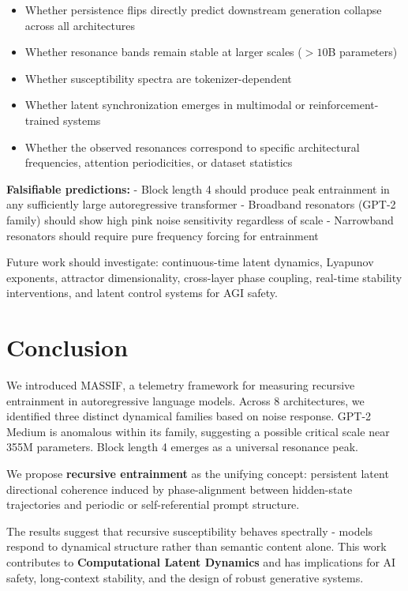 \documentclass{article}
\begin{document}
\begin{itemize}
    \item Whether persistence flips directly predict downstream generation collapse across all architectures
    \item Whether resonance bands remain stable at larger scales ($>10$B parameters)
    \item Whether susceptibility spectra are tokenizer-dependent
    \item Whether latent synchronization emerges in multimodal or reinforcement-trained systems
    \item Whether the observed resonances correspond to specific architectural frequencies, attention periodicities, or dataset statistics
\end{itemize}

\textbf{Falsifiable predictions:}
- Block length 4 should produce peak entrainment in any sufficiently large autoregressive transformer
- Broadband resonators (GPT-2 family) should show high pink noise sensitivity regardless of scale
- Narrowband resonators should require pure frequency forcing for entrainment

Future work should investigate: continuous-time latent dynamics, Lyapunov exponents, attractor dimensionality, cross-layer phase coupling, real-time stability interventions, and latent control systems for AGI safety.

\section{Conclusion}

We introduced MASSIF, a telemetry framework for measuring recursive entrainment in autoregressive language models. Across 8 architectures, we identified three distinct dynamical families based on noise response. GPT-2 Medium is anomalous within its family, suggesting a possible critical scale near 355M parameters. Block length 4 emerges as a universal resonance peak.

We propose \textbf{recursive entrainment} as the unifying concept: persistent latent directional coherence induced by phase-alignment between hidden-state trajectories and periodic or self-referential prompt structure.

The results suggest that recursive susceptibility behaves spectrally - models respond to dynamical structure rather than semantic content alone. This work contributes to \textbf{Computational Latent Dynamics} and has implications for AI safety, long-context stability, and the design of robust generative systems.
\end{document}
